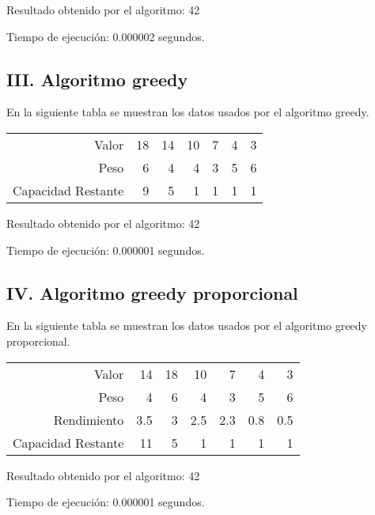 \documentclass{article}
\begin{document}
Resultado obtenido por el algoritmo: 42

Tiempo de ejecución: 0.000002 segundos.
\subsection*{III. Algoritmo greedy}
En la siguiente tabla se muestran los datos usados por el algoritmo greedy.
\begin{table}[h]
\centering
\begin{tabular}{r|rrrrrr}
Valor&18&14&10&7&4&3\\
Peso&6&4&4&3&5&6\\
\hline Capacidad Restante&9&5&1&1&1&1\\
\end{tabular}
\end{table}

Resultado obtenido por el algoritmo: 42

Tiempo de ejecución: 0.000001 segundos.
\subsection*{IV. Algoritmo greedy proporcional}
En la siguiente tabla se muestran los datos usados por el algoritmo greedy proporcional.
\begin{table}[h]
\centering
\begin{tabular}{r|rrrrrr}
Valor&14&18&10&7&4&3\\
Peso&4&6&4&3&5&6\\
Rendimiento&3.5&3&2.5&2.3&0.8&0.5\\
\hline Capacidad Restante&11&5&1&1&1&1\\
\end{tabular}
\end{table}

Resultado obtenido por el algoritmo: 42

Tiempo de ejecución: 0.000001 segundos.
\end{document}
